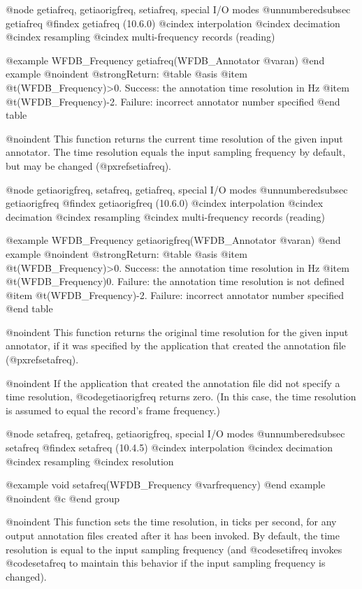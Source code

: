 {{{{{{{{@node     getiafreq, getiaorigfreq, setiafreq, special I/O modes
@unnumberedsubsec getiafreq
@findex getiafreq (10.6.0)
@cindex interpolation
@cindex decimation
@cindex resampling
@cindex multi-frequency records (reading)

@example
WFDB_Frequency getiafreq(WFDB_Annotator @var{an})
@end example
@noindent
@strong{Return:}
@table @asis
@item @t{(WFDB_Frequency)>0.}
Success: the annotation time resolution in Hz
@item @t{(WFDB_Frequency)-2.}
Failure: incorrect annotator number specified
@end table

@noindent
This function returns the current time resolution of the given input annotator.
The time resolution equals the input sampling frequency by default, but may be
changed (@pxref{setiafreq}).

@node     getiaorigfreq, setafreq, getiafreq, special I/O modes
@unnumberedsubsec getiaorigfreq
@findex getiaorigfreq (10.6.0)
@cindex interpolation
@cindex decimation
@cindex resampling
@cindex multi-frequency records (reading)

@example
WFDB_Frequency getiaorigfreq(WFDB_Annotator @var{an})
@end example
@noindent
@strong{Return:}
@table @asis
@item @t{(WFDB_Frequency)>0.}
Success: the annotation time resolution in Hz
@item @t{(WFDB_Frequency)0.}
Failure: the annotation time resolution is not defined
@item @t{(WFDB_Frequency)-2.}
Failure: incorrect annotator number specified
@end table

@noindent
This function returns the original time resolution for the given input
annotator, if it was specified by the application that created the annotation
file (@pxref{setafreq}).

@noindent
If the application that created the annotation file did not specify a time
resolution, @code{getiaorigfreq} returns zero.  (In this case, the time
resolution is assumed to equal the record's frame frequency.)

@node     setafreq, getafreq, getiaorigfreq, special I/O modes
@unnumberedsubsec setafreq
@findex setafreq (10.4.5)
@cindex interpolation
@cindex decimation
@cindex resampling
@cindex resolution

@example
void setafreq(WFDB_Frequency @var{frequency})
@end example
@noindent
@c @end group

@noindent
This function sets the time resolution, in ticks per second, for any output
annotation files created after it has been invoked.  By default, the time
resolution is equal to the input sampling frequency (and @code{setifreq}
invokes @code{setafreq} to maintain this behavior if the input sampling
frequency is changed).

}}}}}}}}
